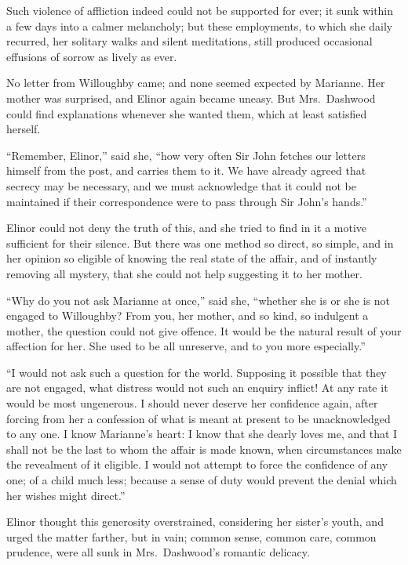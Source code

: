 Such violence of affliction indeed could not be supported
for ever; it sunk within a few days into a calmer melancholy;
but these employments, to which she daily recurred,
her solitary walks and silent meditations, still produced
occasional effusions of sorrow as lively as ever.

No letter from Willoughby came; and none seemed expected
by Marianne.  Her mother was surprised, and Elinor again
became uneasy.  But Mrs.\ Dashwood could find explanations
whenever she wanted them, which at least satisfied herself.

``Remember, Elinor,'' said she, ``how very often Sir John
fetches our letters himself from the post, and carries them
to it.  We have already agreed that secrecy may be necessary,
and we must acknowledge that it could not be maintained if
their correspondence were to pass through Sir John's hands.''

Elinor could not deny the truth of this, and she tried
to find in it a motive sufficient for their silence.
But there was one method so direct, so simple, and in
her opinion so eligible of knowing the real state
of the affair, and of instantly removing all mystery,
that she could not help suggesting it to her mother.

``Why do you not ask Marianne at once,'' said she,
``whether she is or she is not engaged to Willoughby?  From you,
her mother, and so kind, so indulgent a mother, the question
could not give offence.  It would be the natural result
of your affection for her.  She used to be all unreserve,
and to you more especially.''

``I would not ask such a question for the world.
Supposing it possible that they are not engaged,
what distress would not such an enquiry inflict!  At any
rate it would be most ungenerous.  I should never deserve
her confidence again, after forcing from her a confession
of what is meant at present to be unacknowledged to any one.
I know Marianne's heart: I know that she dearly loves me,
and that I shall not be the last to whom the affair is made
known,
when circumstances make the revealment of it eligible.
I would not attempt to force the confidence of any one;
of a child much less; because a sense of duty would prevent
the denial which her wishes might direct.''

Elinor thought this generosity overstrained,
considering her sister's youth, and urged the matter farther,
but in vain; common sense, common care, common prudence,
were all sunk in Mrs.\ Dashwood's romantic delicacy.

